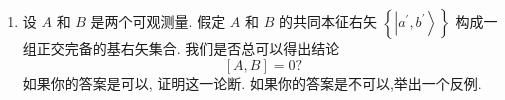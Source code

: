 \begin{enumerate}
	\begin{enumerate}
		\item 假定已测得 ${S}_{x}$ . 得到 $+ \hbar /2$ 的概率是什么?
		\begin{proof}
			这里我们直接给出本征值为$\hbar/2$的$\mathbf{S} \cdot \widehat{\mathbf{n}}$态的构造,可以自行尝试构造.
			\begin{equation}
				\cos\left(\frac{\beta}{2}\right)|+\rangle+\sin\left(\frac{\beta}{2}\right)e^{i\alpha}|-\rangle 
			\end{equation}
			其中$\alpha$和$\beta$分别对应球坐标系下的$(r,\theta,\varphi)$中的后两项,在本题中$\alpha=0,\beta=\gamma$,于是有
			\begin{equation}
				\left|\left[\frac{1}{\sqrt{2}}\langle+|+\frac{1}{\sqrt{2}}\langle-|\right]\left[\cos\frac{\gamma}{2}|+\rangle+\sin\frac{\gamma}{2}|-\rangle\right]\right|^2=\frac{1}{2}\left[\sqrt{\frac{1+\cos\gamma}{2}}+\sqrt{\frac{1-\cos\gamma}{2}}\right]^2=\frac{1+\sin\gamma}{2}
			\end{equation}
		\end{proof}
		\item 计算 ${S}_{x}$ 的弥散度,即
		$$
		\left\langle {\left( {S}_{x} - \left\langle {S}_{x}\right\rangle \right) }^{2}\right\rangle \text{.}
		$$
		(为了让你自己放心起见,验证在 $\gamma = 0,\pi /2$ 和 $\pi$ 等特殊情况下的答案.)
		\begin{proof}
			由第9题我们容易得出$S^2_x=\frac{\hbar^2}4$并且$S_x$的期望
			\begin{equation}
				\left|\left[\frac{1}{\sqrt{2}}\langle+|+\frac{1}{\sqrt{2}}\langle-|\right]\left[\cos\frac{\gamma}{2}|+\rangle+\sin\frac{\gamma}{2}|-\rangle\right]\right|^2=\frac{1}{2}\left[\sqrt{\frac{1+\cos\gamma}{2}}+\sqrt{\frac{1-\cos\gamma}{2}}\right]^2=\frac{1+\sin\gamma}{2}
			\end{equation}
			于是原式为
			\begin{equation}
				\langle(S_{x}-\langle S_{x}\rangle)^{2}\rangle=\hbar^{2}(1-\sin^{2}\gamma)/4=\hbar^{2}\cos^{2}\gamma/4=\hbar^{2}/4,0,\hbar^{2}4\text{分别对于}\gamma=0,\pi/2,\pi.
			\end{equation}
		\end{proof}
	\end{enumerate}
	\item 设 $A$ 和 $B$ 是两个可观测量. 假定 $A$ 和 $B$ 的共同本征右矢 $\left\{ \left| {{a}^{\prime },{b}^{\prime }}\right\rangle \right\}$ 构成一组正交完备的基右矢集合. 我们是否总可以得出结论
	$$
	\left\lbrack {A, B}\right\rbrack = 0?
	$$
	如果你的答案是可以, 证明这一论断. 如果你的答案是不可以,举出一个反例.

\end{enumerate}
